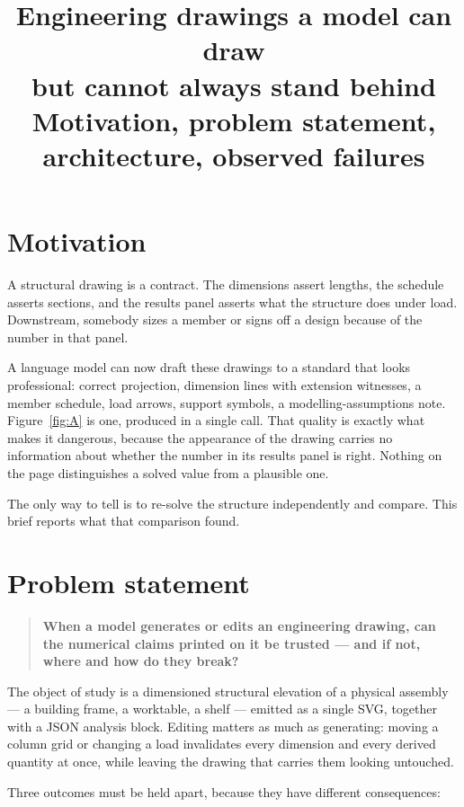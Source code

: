 \documentclass[11pt,a4paper]{article}
\title{\color{researchblue}\LARGE Engineering drawings a model can draw\\but cannot always stand behind\\[6pt]
\Large Motivation, problem statement, architecture, observed failures}
\author{}
\date{}
\begin{document}
\maketitle

\section{Motivation}

A structural drawing is a contract. The dimensions assert lengths, the schedule asserts sections, and
the results panel asserts what the structure does under load. Downstream, somebody sizes a member or
signs off a design because of the number in that panel.

A language model can now draft these drawings to a standard that looks professional: correct
projection, dimension lines with extension witnesses, a member schedule, load arrows, support symbols,
a modelling-assumptions note. Figure~\ref{fig:A} is one, produced in a single call. That quality is
exactly what makes it dangerous, because the appearance of the drawing carries no information about
whether the number in its results panel is right. Nothing on the page distinguishes a solved value
from a plausible one.

The only way to tell is to re-solve the structure independently and compare. This brief reports what
that comparison found.

\section{Problem statement}

\begin{quote}
\textbf{When a model generates or edits an engineering drawing, can the numerical claims printed on it
be trusted --- and if not, where and how do they break?}
\end{quote}

The object of study is a dimensioned structural elevation of a physical assembly --- a building frame,
a worktable, a shelf --- emitted as a single SVG, together with a JSON analysis block. Editing matters
as much as generating: moving a column grid or changing a load invalidates every dimension and every
derived quantity at once, while leaving the drawing that carries them looking untouched.

Three outcomes must be held apart, because they have different consequences:
\end{document}
